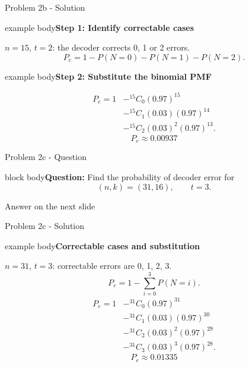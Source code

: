 \documentclass[aspectratio=169,11pt]{beamer}
\newcommand{\qbox}[1]{\begin{beamercolorbox}[rounded=true,wd=\linewidth,sep=0.75em]{block body}\color{darkText}\textbf{Question:} #1\end{beamercolorbox}}
\newenvironment{answerbox}[1]{\begin{beamercolorbox}[rounded=true,wd=\linewidth,sep=0.75em]{example body}\color{darkText}\textbf{#1}\par\medskip}{\end{beamercolorbox}}
\newcommand{\nextanswer}{\vfill\centering\textcolor{mutedText}{\Large Answer on the next slide}}
\begin{document}
\begin{frame}{Problem 2b - Solution}
\small
\begin{answerbox}{Step 1: Identify correctable cases}
$n=15$, $t=2$: the decoder corrects 0, 1 or 2 errors.
\[
P_e=1-P(N=0)-P(N=1)-P(N=2).
\]
\end{answerbox}
\begin{answerbox}{Step 2: Substitute the binomial PMF}
\[
\begin{aligned}
P_e=1&-{}^{15}C_0(0.97)^{15}\\
     &-{}^{15}C_1(0.03)(0.97)^{14}\\
     &-{}^{15}C_2(0.03)^2(0.97)^{13}.
\end{aligned}
\]
\[
\boxed{P_e\approx0.00937}
\]
\end{answerbox}
\end{frame}

\begin{frame}{Problem 2c - Question}
\qbox{Find the probability of decoder error for
\[
(n,k)=(31,16),\qquad t=3.
\]}
\nextanswer
\end{frame}

\begin{frame}{Problem 2c - Solution}
\footnotesize
\begin{answerbox}{Correctable cases and substitution}
$n=31$, $t=3$: correctable errors are 0, 1, 2, 3.
\[
P_e=1-\sum_{i=0}^{3}P(N=i).
\]
\[
\begin{aligned}
P_e=1&-{}^{31}C_0(0.97)^{31}\\
     &-{}^{31}C_1(0.03)(0.97)^{30}\\
     &-{}^{31}C_2(0.03)^2(0.97)^{29}\\
     &-{}^{31}C_3(0.03)^3(0.97)^{28}.
\end{aligned}
\]
\[
\boxed{P_e\approx0.01335}
\]
\end{answerbox}
\end{frame}
\end{document}
